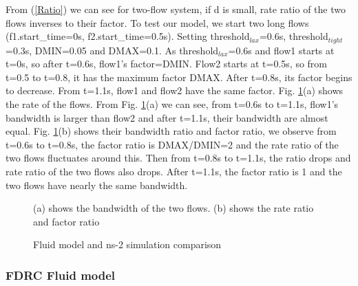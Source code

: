 \documentclass[10pt, conference, letterpaper]{IEEEtran}
\begin{document}
From (\ref{Ratio}) we can see for two-flow system, if d is small, rate ratio of the two flows inverses to their factor.
To test our model, we start two long flows (f1.start\_time=0s, f2.start\_time=0.5s). 
Setting threshold$_{lax}$=0.6s, threshold$_{tight}$=0.3s, DMIN=0.05 and DMAX=0.1. 
As threshold$_{lax}$=0.6s and flow1 starts at t=0s, so after t=0.6s, flow1's factor=DMIN.
Flow2 starts at t=0.5s, so from t=0.5 to t=0.8, it has the maximum factor DMAX. After t=0.8s, its factor begins to decrease. 
From t=1.1s, flow1 and flow2 have the same factor. 
Fig. \ref{model-rate-ratio}(a) shows the rate of the flows.
From Fig. \ref{model-rate-ratio}(a) we can see, from t=0.6s to t=1.1s, flow1's bandwidth is larger than flow2 and after t=1.1s, their bandwidth are almost equal.
Fig. \ref{model-rate-ratio}(b) shows their bandwidth ratio and factor ratio, we observe from t=0.6s to t=0.8s,
the factor ratio is DMAX/DMIN=2 and the rate ratio of the two flows fluctuates around this. Then from t=0.8s to t=1.1s, the
ratio drops and rate ratio of the two flows also drops. After t=1.1s, the factor ratio is 1 and the two flows have nearly the same bandwidth.



\begin{figure}[t]
\centering
{}
\caption{(a) shows the bandwidth of the two flows. (b) shows the rate ratio and factor ratio}
\label{model-rate-ratio}
\end{figure}







\begin{figure*}[!htb]
\centering
{}
\caption{Fluid model and ns-2 simulation comparison}
\label{fluid-model-fig}
\end{figure*}


\subsubsection{FDRC Fluid model}
\end{document}
